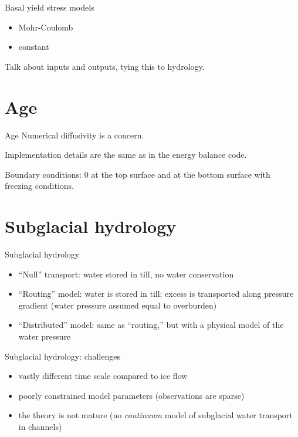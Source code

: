 \documentclass[notes,intlimits]{beamer}
\begin{document}
\begin{frame}{Basal yield stress models}
  \begin{itemize}
  \item Mohr-Coulomb
  \item constant
  \end{itemize}

  Talk about inputs and outputs, tying this to hydrology.
\end{frame}

\section{Age}
\label{sec:age}

\begin{frame}{Age}
  Numerical diffusivity is a concern.

  Implementation details are the same as in the energy balance code.

  Boundary conditions: 0 at the top surface and at the bottom surface
  with freezing conditions.
\end{frame}

\section{Subglacial hydrology}
\label{sec:subglacial-hydrology}

\begin{frame}{Subglacial hydrology}

  \begin{itemize}
  \item ``Null'' transport: water stored in till, no water conservation
  \item ``Routing'' model: water is stored in till; excess is
    transported along pressure gradient (water pressure assumed equal
    to overburden)
  \item ``Distributed'' model: same as ``routing,'' but with a
    physical model of the water pressure
  \end{itemize}
\end{frame}

\begin{frame}{Subglacial hydrology: challenges}
  \begin{itemize}
  \item vastly different time scale compared to ice flow
  \item poorly constrained model parameters (observations are sparse)
  \item the theory is not mature (no \emph{continuum} model of
    subglacial water transport in channels)
  \end{itemize}
\end{frame}

\end{document}
